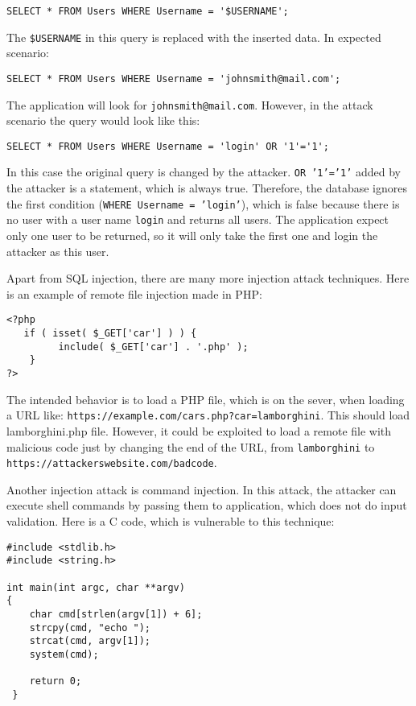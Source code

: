 \documentclass[a4paper]{article}
\begin{document}
\begin{verbatim}
SELECT * FROM Users WHERE Username = '$USERNAME';
\end{verbatim}

The \texttt{\$USERNAME} in this query is replaced with the inserted data. In
expected scenario:

\begin{verbatim}
SELECT * FROM Users WHERE Username = 'johnsmith@mail.com';
\end{verbatim}

The application will look for \texttt{johnsmith@mail.com}. However, in the
attack scenario the query would look like this:

\begin{verbatim}
SELECT * FROM Users WHERE Username = 'login' OR '1'='1';
\end{verbatim}

In this case the original query is changed by the attacker. \texttt{OR '1'='1'}
added by the attacker is a statement, which is always true. Therefore, the
database ignores the first condition (\texttt{WHERE Username = 'login'}), which
is false because there is no user with a user name \texttt{login} and returns
all users. The application expect only one user to be returned, so it will only
take the first one and login the attacker as this user.

Apart from SQL injection, there are many more injection attack techniques. Here
is an example of remote file injection made in PHP:

\begin{verbatim}
<?php
   if ( isset( $_GET['car'] ) ) {
         include( $_GET['car'] . '.php' );
    }
?>
\end{verbatim}

The intended behavior is to load a PHP file, which is on the sever, when loading
a URL like: \texttt{https://example.com/cars.php?car=lamborghini}. This should
load lamborghini.php file. However, it could be exploited to load a remote file
with malicious code just by changing the end of the URL, from
\texttt{lamborghini} to \texttt{https://attackerswebsite.com/badcode}.

Another injection attack is command injection. In this attack, the attacker can
execute shell commands by passing them to application, which does not do input
validation. Here is a C code, which is vulnerable to this technique:

\begin{verbatim}
#include <stdlib.h>
#include <string.h>

int main(int argc, char **argv)
{
	char cmd[strlen(argv[1]) + 6];
	strcpy(cmd, "echo ");
	strcat(cmd, argv[1]);
	system(cmd);
        
	return 0;
 }
\end{verbatim}
\end{document}
